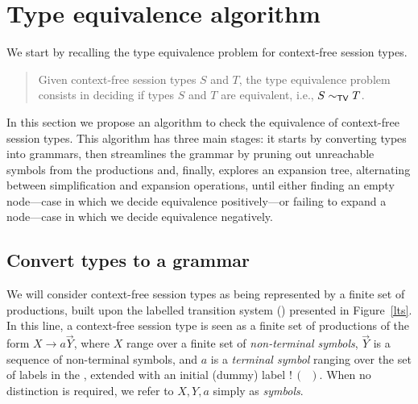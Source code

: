 \section{Type equivalence algorithm}
\label{sec:algorithm}

We start by recalling the type equivalence problem for context-free 
session types.

\begin{quote}
  Given context-free session types $S$ and $T$, the type equivalence
  problem consists in deciding if types $S$ and $T$ are equivalent,
  i.e., $S \sim_{\mathsf{TV}} T$.
\end{quote}

In this section we propose an algorithm to check the equivalence of 
context-free session types. This algorithm has three main stages: 
it starts by converting types into grammars, then streamlines the grammar
by pruning out unreachable symbols from the productions and, finally, 
explores an expansion tree, alternating 
between simplification and expansion operations, until either finding 
an empty node---case in which we decide equivalence positively---or 
failing to expand a node---case in which we decide equivalence negatively.

\subsection{Convert types to a grammar}
\label{subsec:typeToGrammar}

We will consider context-free session types as being represented by a 
finite set of productions, built upon the labelled transition system (\LTS)
presented in Figure~\ref{lts}. In this line, a context-free session type 
is seen as a finite set of productions of the form $X\rightarrow a \vec Y$, 
where $X$ range over a finite set of \emph{non-terminal symbols}, $\vec Y$ 
is a sequence of non-terminal symbols, and $a$ is a \emph{terminal symbol}
ranging over the set of labels in the \LTS, extended with an initial (dummy) 
label $!\,(\enspace)$. When no distinction is required, we refer to $X, Y, a$ 
simply as \emph{symbols}.

